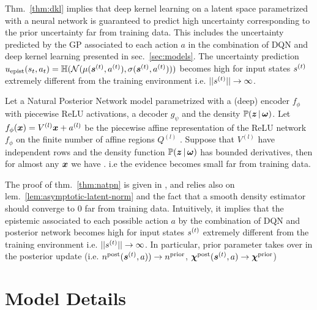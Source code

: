 Thm.~\ref{thm:dkl} implies that deep kernel learning on a latent space parametrized with a neural network is guaranteed to predict high uncertainty corresponding to the prior uncertainty far from training data. This includes the uncertainty predicted by the GP associated to each action $a$ in the combination of DQN and deep kernel learning presented in sec.~\ref{sec:models}. The uncertainty prediction $u_\text{epist}(s_t, a_t) = \operatorname{\mathbb{H}}(\operatorname{\mathcal{N}}(\mu(\bm{s}^{(t)}, a^{(t)}), \sigma(\bm{s}^{(t)}, a^{(t)})))$ becomes high for input states $s^{(t)}$ extremely different from the training environment i.e. $||s^{(t)}|| \rightarrow \infty$.

\begin{theorem}
\label{thm:natpn}
\cite{natpn} Let a Natural Posterior Network model parametrized with a (deep) encoder $f_{\phi}$ with piecewise ReLU activations, a decoder $g_{\psi}$ and the density $\mathbb{P}(\bm{z} \,|\, \bm{\omega})$. Let $f_{\phi}(\bm{x})= V^{(l)}\bm{x} + a^{(l)}$ be the piecewise affine representation of the ReLU network $f_{\phi}$ on the finite number of affine regions $Q^{(l)}$ \citep{understanding-nn-relu}. Suppose that $V^{(l)}$ have independent rows and the density function $\mathbb{P}(\bm{z} \,|\, \bm{\omega})$ has bounded derivatives, then for almost any $\bm{x}$ we have . i.e the evidence becomes small far from training data.
\end{theorem}

The proof of thm.~\ref{thm:natpn} is given in \cite{natpn}, and relies also on lem.~\ref{lem:asymptotic-latent-norm} and the fact that a smooth density estimator should converge to $0$ far from training data. Intuitively, it implies that the epistemic associated to each possible action $a$ by the combination of DQN and posterior network becomes high for input states $s^{(t)}$ extremely different from the training environment i.e. $||s^{(t)}|| \rightarrow \infty$. In particular, prior parameter takes over in the posterior update (i.e. $n^\text{post}(\bm{s}^{(t)}, a)) \rightarrow n^\text{prior}$, $\bm{\chi}^\text{post}(\bm{s}^{(t)}, a) \rightarrow \bm{\chi}^\text{prior}$)

\section{Model Details}
\label{app:models-details}

